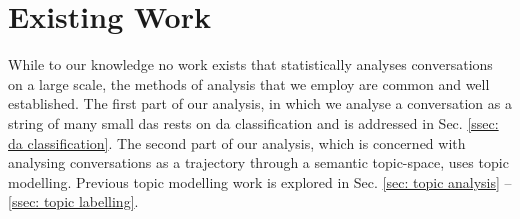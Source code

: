 \chapter{Existing Work}

While to our knowledge no work exists that statistically analyses conversations on a large scale, the methods of analysis that we employ are common and well established. The first part of our analysis, in which we analyse a conversation as a string of many small \glspl{da} rests on \gls{da} classification and is addressed in Sec. \ref{ssec: da classification}. The second part of our analysis, which is concerned with analysing conversations as a trajectory through a semantic topic-space, uses topic modelling. Previous topic modelling work is explored in Sec. \ref{sec: topic analysis} -- \ref{ssec: topic labelling}.



 

 


\glsresetall